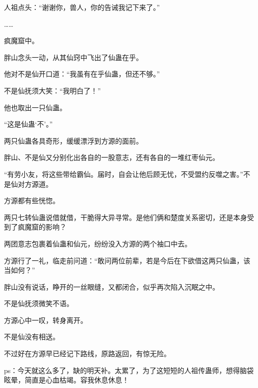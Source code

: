 \begin{this_body}
人祖点头：“谢谢你，兽人，你的告诫我记下来了。”

……

疯魔窟中。

胖山念头一动，从其仙窍中飞出了仙蛊在乎。

他对不是仙开口道：“我虽有在乎仙蛊，但还不够。”

不是仙抚须大笑：“我明白了！”

他也取出一只仙蛊。

“这是仙蛊‘不’。”

两只仙蛊各具奇形，缓缓漂浮到方源的面前。

胖山、不是仙又分别化出各自的一股意志，还有各自的一堆红枣仙元。

“有劳小友，将这些带给霸仙。届时，自会让他后顾无忧，不受盟约反噬之害。”不是仙对方源道。

方源都有些恍惚。

两只七转仙蛊说借就借，干脆得大异寻常。是他们俩和楚度关系密切，还是本身受到了疯魔窟的影响？

两团意志包裹着仙蛊和仙元，纷纷没入方源的两个袖口中去。

方源行了一礼，临走前问道：“敢问两位前辈，若是今后在下欲借这两只仙蛊，该当如何？”

胖山没有说话，睁开的一丝眼缝，又都闭合，似乎再次陷入沉眠之中。

不是仙抚须微笑不语。

方源心中一叹，转身离开。

不是仙没有相送。

不过好在方源早已经记下路线，原路返回，有惊无险。

ps：今天就这么多了，缺的明天补。太累了，为了这短短的人祖传蛊师，想得脑袋眩晕，简直是心血枯竭。容我休息休息！

\end{this_body}

